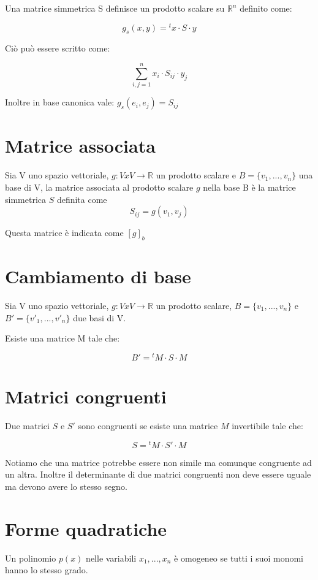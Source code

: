 \documentclass[a4paper, 10pt]{article}
\begin{document}
Una matrice simmetrica S definisce un prodotto scalare su $\mathbb{R}^n$ definito come:

$$g_s(x,y) = {^t}x \cdot S \cdot y$$

Ciò può essere scritto come: 

$$\sum_{i,j=1}^{n}x_i \cdot S_{ij} \cdot y_j$$

Inoltre in base canonica vale: $g_s(e_i, e_j) = S_{ij}$

\section{Matrice associata}

Sia V uno spazio vettoriale, $g: V x V \rightarrow \mathbb{R}$ un prodotto scalare e $B=\{v_1, ..., v_n\}$ una base di V, la matrice associata al prodotto scalare $g$ nella base B è la matrice simmetrica $S$ definita come $$S_{ij} = g(v_1, v_j)$$

Questa matrice è indicata come $[g]_b$


\section{Cambiamento di base}

Sia V uno spazio vettoriale, $g: V x V \rightarrow \mathbb{R}$ un prodotto scalare, $B=\{v_1, ..., v_n\}$ e $B'=\{v'_1, ..., v'_n\}$ due basi di V.

Esiste una matrice M tale che:

$$B'={^t}M \cdot S \cdot M$$

\section{Matrici congruenti}

Due matrici $S$ e $S'$ sono congruenti se esiste una matrice $M$ invertibile tale che:

$$S={^t}M \cdot S' \cdot M$$

Notiamo che una matrice potrebbe essere non simile ma comunque congruente ad un altra. Inoltre il determinante di due matrici congruenti non deve essere uguale ma devono avere lo stesso segno.

\section{Forme quadratiche}

Un polinomio $p(x)$ nelle variabili $x_1, ..., x_n$ è omogeneo se tutti i suoi monomi hanno lo stesso grado.
\end{document}
